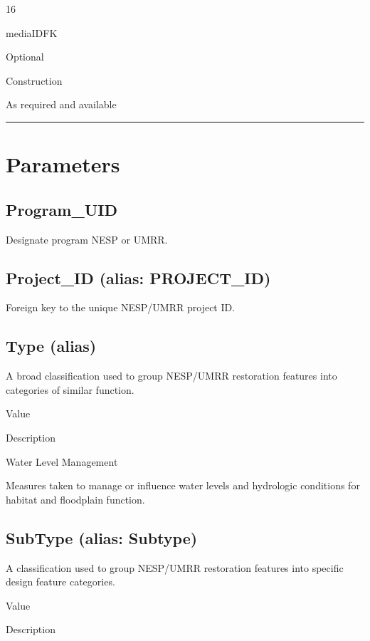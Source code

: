 \documentclass[
  letterpaper,
  DIV=11,
  numbers=noendperiod]{scrreprt}
\begin{document}
16

mediaIDFK

Optional

Construction

As required and available

\begin{center}\rule{0.5\linewidth}{0.5pt}\end{center}

\section{Parameters}\label{parameters-15}

\subsection{Program\_UID}\label{program_uid-15}

Designate program NESP or UMRR.

\subsection{Project\_ID (alias:
PROJECT\_ID)}\label{project_id-alias-project_id-15}

Foreign key to the unique NESP/UMRR project ID.

\subsection{Type (alias)}\label{type-alias-14}

A broad classification used to group NESP/UMRR restoration features into
categories of similar function.

Value

Description

Water Level Management

Measures taken to manage or influence water levels and hydrologic
conditions for habitat and floodplain function.

\subsection{SubType (alias: Subtype)}\label{subtype-alias-subtype-15}

A classification used to group NESP/UMRR restoration features into
specific design feature categories.

Value

Description
\end{document}
